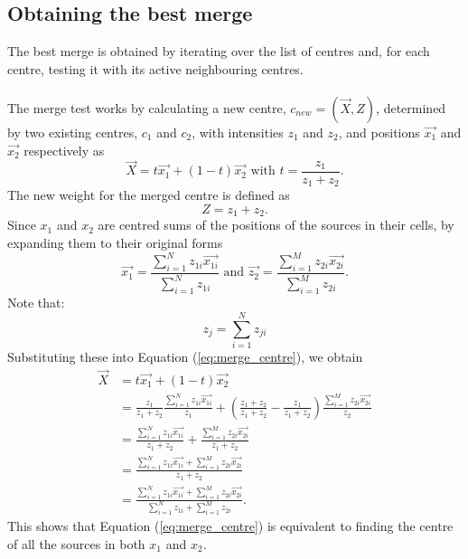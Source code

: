 \subsection{Obtaining the best merge}
The best merge is obtained by iterating over the list of centres and, for each centre, testing it with its active neighbouring centres.
\\
\\
The merge test works by calculating a new centre, $c_{new} = (\vec{X},Z)$, determined by two existing centres, $c_1$ and $c_2$, with intensities $z_1$ and $z_2$, and positions $\vec{x_1}$ and $\vec{x_2}$ respectively as
\begin{equation} \label{eq:merge_centre}
	\vec{X} = t\vec{x_1} + (1-t)\vec{x_2} \text{  with  } t = \frac{z_1}{z_1 + z_2}.
\end{equation}
The new weight for the merged centre is defined as
\begin{equation}
	Z = z_1 + z_2.
\end{equation}
Since $x_1$ and $x_2$ are centred sums of the positions of the sources in their cells, by expanding them to their original forms
\begin{equation*}
\vec{x_1} = \frac{\sum^N_{i=1} z_{1i}\vec{x_{1i}}}{\sum^N_{i=1}z_{1i}} \text{  and  } \vec{z_2} = \frac{\sum^M_{i=1} z_{2i}\vec{x_{2i}}}{\sum^M_{i=1}z_{2i}}.
\end{equation*}
Note that:
\begin{equation*}
	z_j = \sum^N_{i=1}z_{ji}
\end{equation*}
Substituting these into Equation (\ref{eq:merge_centre}), we obtain
\begin{align*}
	\vec{X}	&= t\vec{x_1} + (1-t)\vec{x_2} \\
		&= \frac{z_1}{z_1 + z_2}\frac{\sum^N_{i=1} z_{1i}\vec{x_{1i}}}{z_1} + (\frac{z_1 + z_2}{z_1 + z_2} - \frac{z_1}{z_1 + z_2})\frac{\sum^M_{i=1} z_{2i}\vec{x_{2i}}}{z_2} \\
		&= \frac{\sum^N_{i=1} z_{1i}\vec{x_{1i}}}{z_1 + z_2} + \frac{\sum^M_{i=1} z_{2i}\vec{x_{2i}}}{z_1 + z_2} \\
		&= \frac{\sum^N_{i=1} z_{1i}\vec{x_{1i}} + \sum^M_{i=1} z_{2i}\vec{x_{2i}}}{z_1 + z_2} \\
		&= \frac{\sum^N_{i=1} z_{1i}\vec{x_{1i}} + \sum^M_{i=1} z_{2i}\vec{x_{2i}}}{\sum^N_{i=1}z_{1i} + \sum^M_{i=1}z_{2i}}.
\end{align*}
This shows that Equation (\ref{eq:merge_centre}) is equivalent to finding the centre of all the sources in both $x_1$ and $x_2$.
\\

